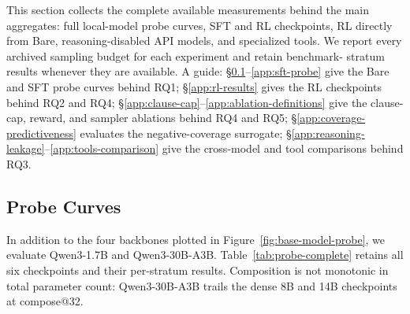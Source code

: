This section collects the complete available measurements behind the main
aggregates: full local-model probe curves, SFT and RL checkpoints, RL directly
from Bare, reasoning-disabled API models, and specialized tools.  We report
every archived sampling budget for each experiment and retain benchmark-
stratum results whenever they are available.  A guide:
\S\ref{app:probe-curves}--\ref{app:sft-probe} give the Bare and SFT probe
curves behind RQ1; \S\ref{app:rl-results} gives the RL checkpoints behind
RQ2 and RQ4; \S\ref{app:clause-cap}--\ref{app:ablation-definitions} give the
clause-cap, reward, and sampler ablations behind RQ4 and RQ5;
\S\ref{app:coverage-predictiveness} evaluates the negative-coverage
surrogate; \S\ref{app:reasoning-leakage}--\ref{app:tools-comparison} give
the cross-model and tool comparisons behind RQ3.

\subsection{Probe Curves}
\label{app:probe-curves}

In addition to the four backbones plotted in Figure~\ref{fig:base-model-probe},
we evaluate Qwen3-1.7B and Qwen3-30B-A3B.  Table~\ref{tab:probe-complete}
retains all six checkpoints and their per-stratum results.  Composition is
not monotonic in total parameter count: Qwen3-30B-A3B trails the dense 8B
and 14B checkpoints at compose@32.

